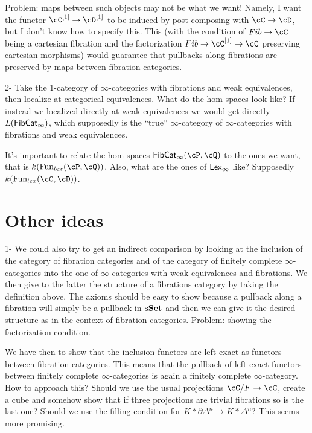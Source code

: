 \documentclass[a4paper,12pt,openany]{scrartcl}
\begin{document}
Problem: maps between such objects may not be what we want! Namely, I want the
functor $\cC^{[1]}\rightarrow\cD^{[1]}$ to be induced by post-composing with
$\cC\rightarrow\cD$, but I don't know how to specify this. This (with the
condition of $Fib\rightarrow\cC$ being a cartesian fibration and the
factorization $Fib\rightarrow\cC^{[1]}\rightarrow\cC$ preserving cartesian
morphisms) would guarantee that pullbacks along fibrations are preserved by maps
between fibration categories.

2- Take the 1-category of $\infty$-categories with fibrations and weak
equivalences, then localize at categorical equivalences. What do the hom-spaces
look like? If instead we localized directly at weak equivalences we would get
directly $L(\operatorname{\mathsf{FibCat}}_\infty)$, which supposedly is the ``true'' $\infty$-category
of $\infty$-categories with fibrations and weak equivalences.

It's important to relate the hom-spaces $\FibCat_\infty(\cP,\cQ)$ to the ones we
want, that is $k(\Fun_{lex}(\cP,\cQ))$. Also, what are the ones of $\operatorname{\mathsf{Lex}_\infty}$ like?
Supposedly $k(\Fun_{lex}(\cC,\cD))$.

\section{Other ideas}

1- We could also try to get an indirect comparison by looking at the inclusion of the category of fibration categories and of the category of finitely complete $\infty$-categories into the one of $\infty$-categories with weak equivalences and fibrations. We then give to the latter the structure of a fibrations category by taking the definition above. The axioms should be easy to show because a pullback along a fibration will simply be a pullback in $\operatorname{\mathbf{sSet}}$ and then we can give it the desired structure as in the context of fibration categories. Problem: showing the factorization condition.

We have then to show that the inclusion functors are left exact as functors between fibration categories. This means that the pullback of left exact functors between finitely complete $\infty$-categories is again a finitely complete $\infty$-category. How to approach this? Should we use the usual projections $\cC/F\rightarrow\cC$, create a cube and somehow show that if three projections are trivial fibrations so is the last one? Should we use the filling condition for $K*\partial\Delta^n\rightarrow K*\Delta^n$? This seems more promising.
\end{document}
